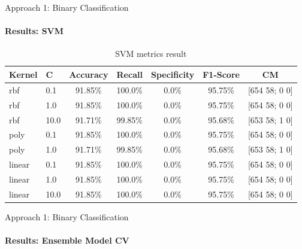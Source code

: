 \documentclass[9pt, pstricks, xcolor=dvipsnames]{beamer}
\begin{document}
\begin{frame}{Approach 1: Binary Classification}
\framesubtitle{Results: SVM}
\begin{table}[H]
    \centering
    \begin{tabular}{llccccc}
        \toprule
        Kernel & C & Accuracy & Recall & Specificity & F1-Score & CM \\
        \midrule
        rbf & 0.1 & 91.85\%  & 100.0\%  & 0.0\%  & 95.75\% & [654 58; 0 0] \\
        rbf & 1.0 & 91.85\%  & 100.0\%  & 0.0\%  & 95.75\% & [654 58; 0 0] \\
        rbf & 10.0 & 91.71\%  & 99.85\%  & 0.0\%  & 95.68\% & [653 58; 1 0] \\
        poly & 0.1 & 91.85\%  & 100.0\%  & 0.0\%  & 95.75\% & [654 58; 0 0] \\
        poly & 1.0 & 91.71\%  & 99.85\%  & 0.0\%  & 95.68\% & [653 58; 1 0] \\
        linear & 0.1 & 91.85\%  & 100.0\%  & 0.0\%  & 95.75\% & [654 58; 0 0] \\
        linear & 1.0 & 91.85\%  & 100.0\%  & 0.0\%  & 95.75\% & [654 58; 0 0] \\
        linear & 10.0 & 91.85\%  & 100.0\%  & 0.0\%  & 95.75\% & [654 58; 0 0] \\
        \bottomrule
    \end{tabular}
    \caption{SVM metrics result}
    \label{tab:SVM_approach1}

\end{table}
\end{frame}
\begin{frame}{Approach 1: Binary Classification}
\framesubtitle{Results: Ensemble Model CV}
\begin{table}[H]
    \centering
    \caption{Ensemble Model metrics result for CrossValidation}
    \label{tab:EM_CV_approach1}
\end{table}
\end{frame}
\end{document}
